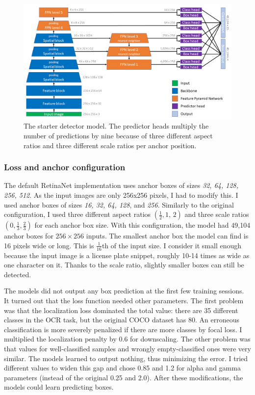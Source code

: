 \begin{figure}[htb]
 \centerline{\includegraphics[width=1.0\columnwidth]{.//Figure/OCR/starter_detector.png}}
 \caption{The starter detector model. The predictor heads multiply the number of predictions by nine because of three different aspect ratios and three different scale ratios per anchor position.}
 \label{fig:starter_detector}
\end{figure}

\subsubsection{Loss and anchor configuration}

The default RetinaNet implementation uses anchor boxes of sizes \textit{32, 64, 128, 256, 512}. As the input images are only 256x256 pixels, I had to modify this. I used anchor boxes of sizes \textit{16, 32, 64, 128}, and \textit{256}. Similarly to the original configuration, I used three different aspect ratios \((\frac{1}{2}, \textit{1, 2})\) and three scale ratios \((\textit{0}, \frac{1}{3}, \frac{2}{3})\) for each anchor box size. With this configuration, the model had 49,104 anchor boxes for $256\times256$ inputs. The smallest anchor box the model can find is 16 pixels wide or long. This is \(\frac{1}{16}\)th of the input size. I consider it small enough because the input image is a license plate snippet, roughly 10-14 times as wide as one character on it. Thanks to the scale ratio, slightly smaller boxes can still be detected.

The models did not output any box prediction at the first few training sessions. It turned out that the loss function needed other parameters. The first problem was that the localization loss dominated the total value: there are 35 different classes in the OCR task, but the original COCO dataset has 80. An erroneous classification is more severely penalized if there are more classes by focal loss. I multiplied the localization penalty by 0.6 for downscaling. The other problem was that values for well-classified samples and wrongly empty-classified ones were very similar. The models learned to output nothing, thus minimizing the error. I tried different values to widen this gap and chose 0.85 and 1.2 for alpha and gamma parameters (instead of the original 0.25 and 2.0). After these modifications, the models could learn predicting boxes.

